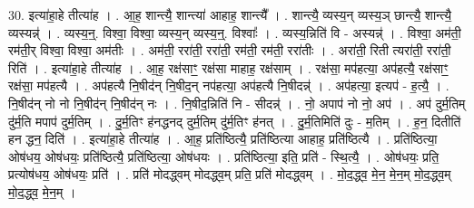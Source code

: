 \documentclass[17pt]{extarticle}
\begin{document}
30. इत्या॑हा॒हे तीत्या॑ह । . आ॒ह॒ शान्त्यै॒ शान्त्या॑ आहाह॒ शान्त्यै᳚ । . शान्त्यै॒ व्यस्य॒न् व्यस्य॒ञ् छान्त्यै॒ शान्त्यै॒ व्यस्यन्न्॑ । . व्यस्य॒न्॒. विश्वा॒ विश्वा॒ व्यस्य॒न् व्यस्य॒न्॒. विश्वाः᳚ । . व्यस्य॒न्निति॑ वि - अस्यन्न्॑ । . विश्वा॒ अम॑ती॒ रम॑ती॒र् विश्वा॒ विश्वा॒ अम॑तीः । . अम॑ती॒ ररा॑ती॒ ररा॑ती॒ रम॑ती॒ रम॑ती॒ ररा॑तीः । . अरा॑ती॒ रिती त्यरा॑ती॒ ररा॑ती॒ रिति॑ । . इत्या॑हा॒हे तीत्या॑ह । . आ॒ह॒ रक्ष॑साꣳ॒॒ रक्ष॑सा माहाह॒ रक्ष॑साम् । . रक्ष॑सा॒ मप॑हत्या॒ अप॑हत्यै॒ रक्ष॑साꣳ॒॒ रक्ष॑सा॒ मप॑हत्यै । . अप॑हत्यै नि॒षीद॑न् नि॒षीद॒न् नप॑हत्या॒ अप॑हत्यै नि॒षीदन्न्॑ । . अप॑हत्या॒ इत्यप॑ - ह॒त्यै॒ । . नि॒षीद॑न् नो नो नि॒षीद॑न् नि॒षीद॑न् नः । . नि॒षीद॒न्निति॑ नि - सीदन्न्॑ । . नो॒ अपाप॑ नो नो॒ अप॑ । . अप॑ दुर्म॒तिम् दु॑र्म॒ति मपाप॑ दुर्म॒तिम् । . दु॒र्म॒तिꣳ ह॑नद्धनद् दुर्म॒तिम् दु॑र्म॒तिꣳ ह॑नत् । . दु॒र्म॒तिमिति॑ दुः - म॒तिम् । . ह॒न॒ दितीति॑ हन द्धन॒ दिति॑ । . इत्या॑हा॒हे तीत्या॑ह । . आ॒ह॒ प्रति॑ष्ठित्यै॒ प्रति॑ष्ठित्या आहाह॒ प्रति॑ष्ठित्यै । . प्रति॑ष्ठित्या॒ ओष॑धय॒ ओष॑धयः॒ प्रति॑ष्ठित्यै॒ प्रति॑ष्ठित्या॒ ओष॑धयः । . प्रति॑ष्ठित्या॒ इति॒ प्रति॑ - स्थि॒त्यै॒ । . ओष॑धयः॒ प्रति॒ प्रत्योष॑धय॒ ओष॑धयः॒ प्रति॑ । . प्रति॑ मोदद्ध्वम् मोदद्ध्व॒म् प्रति॒ प्रति॑ मोदद्ध्वम् । . मो॒द॒द्ध्व॒ मे॒न॒ मे॒न॒म् मो॒द॒द्ध्व॒म् मो॒द॒द्ध्व॒ मे॒न॒म् । \newline
\end{document}
